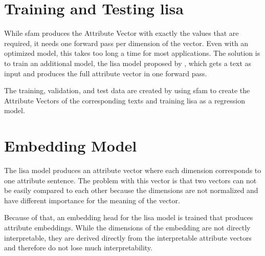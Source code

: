 \section{Training and Testing \acs{lisa}}
\label{sec:approach:lisa}
While \ac{sfam} produces the Attribute Vector with exactly the values that are required, it needs one forward pass per dimension of the vector. Even with an optimized model, this takes too long a time for most applications. The solution is to train an additional model, the \acf{lisa} model proposed by \citet{patelLearningInterpretableStyle2023}, which gets a text as input and produces the full attribute vector in one forward pass.

The training, validation, and test data are created by using \ac{sfam} to create the Attribute Vectors of the corresponding texts and training \ac{lisa} as a regression model.


\section{Embedding Model}
\label{sec:approach:embedding}
The \ac{lisa} model produces an attribute vector where each dimension corresponds to one attribute sentence. The problem with this vector is that two vectors can not be easily compared to each other because the dimensions are not normalized and have different importance for the meaning of the vector.

Because of that, an embedding head for the \ac{lisa} model is trained that produces attribute embeddings. While the dimensions of the embedding are not directly interpretable, they are derived directly from the interpretable attribute vectors and therefore do not lose much interpretability.

